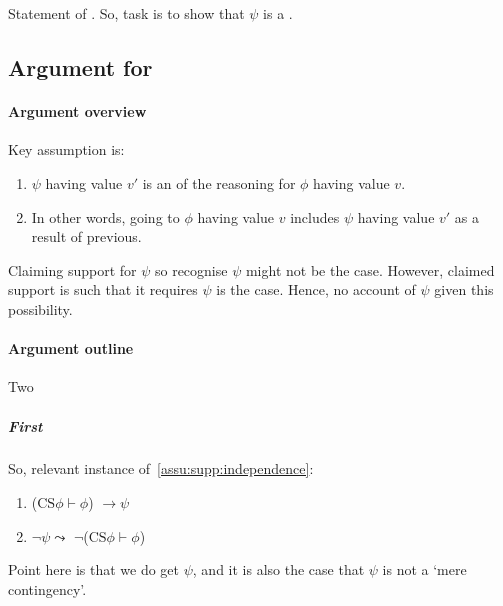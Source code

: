 \section{\LCS{}}
\label{sec:details-ni}
\label{sec:re-do-ni}

\begin{note}
  Statement of \LCS{}.
  So, task is to show that \(\psi\) is a \cprequ{}.
\end{note}

\subsection{Argument for \LCS{}}
\label{sec:argument-for-lcs}

\paragraph{Argument overview}

\begin{note}
  Key assumption is:

  \assuCSRReq*
\end{note}

\begin{note}
  \begin{enumerate}
  \item \(\psi\) having value \(v'\) is an \cprequ{} of the reasoning for \(\phi\) having value \(v\).
  \item In other words, going to \(\phi\) having value \(v\) includes \(\psi\) having value \(v'\) as a result of previous.
  \end{enumerate}
  Claiming support for \(\psi\) so recognise \(\psi\) might not be the case.
  However, claimed support is such that it requires \(\psi\) is the case.
  Hence, no account of \(\psi\) given this possibility.
\end{note}

\paragraph{Argument outline}

\begin{note}
  Two 
\end{note}

\subparagraph{First \requ{}}

\begin{note}
  So, relevant instance of~\autoref{assu:supp:independence}:
  \begin{enumerate}
  \item (\(\text{CS}\phi \vdash \phi\)) \(\rightarrow \psi\)
  \item \(\lnot\psi \leadsto\) \(\lnot\)(\(\text{CS}\phi \vdash \phi\))
  \end{enumerate}

  Point here is that we do get \(\psi\), and it is also the case that \(\psi\) is not a `mere contingency'.
\end{note}

